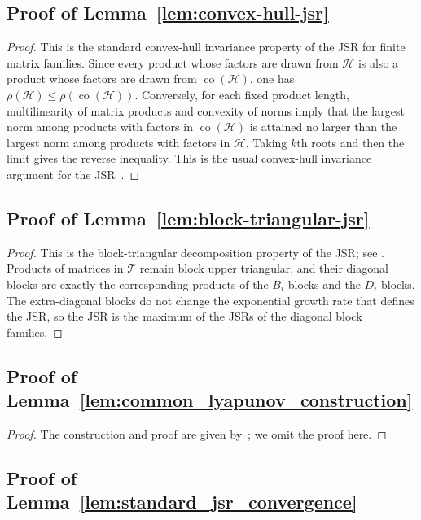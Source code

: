 \documentclass[letterpaper]{article}
\numberwithin{equation}{section}
\newcommand{\co}{\operatorname{co}}
\begin{document}
\subsection{Proof of Lemma~\ref{lem:convex-hull-jsr}}
\label{app:proof-lem-convex-hull-jsr}
\begin{proof}
This is the standard convex-hull invariance property of the JSR for finite matrix
families. Since every product whose factors are drawn from $\mathcal H$ is also a
product whose factors are drawn from $\co(\mathcal H)$, one has
$\rho(\mathcal H)\leq \rho(\co(\mathcal H))$. Conversely, for each fixed product
length, multilinearity of matrix products and convexity of norms imply that the
largest norm among products with factors in $\co(\mathcal H)$ is attained no
larger than the largest norm among products with factors in $\mathcal H$. Taking
$k$th roots and then the limit gives the reverse inequality. This is the usual
convex-hull invariance argument for the JSR~\citep[Chapter~1]{jungers2009joint}.
\end{proof}

\subsection{Proof of Lemma~\ref{lem:block-triangular-jsr}}
\label{app:proof-lem-block-triangular-jsr}

\begin{proof}
This is the block-triangular decomposition property of the JSR; see \citep[Proposition~1.5]{jungers2009joint}. Products of matrices in
$\mathcal T$ remain block upper triangular, and their diagonal blocks are exactly
the corresponding products of the $B_i$ blocks and the $D_i$ blocks. The
extra-diagonal blocks do not change the exponential growth rate that defines the
JSR, so the JSR is the maximum of the JSRs of the diagonal block families.
\end{proof}

\subsection{Proof of Lemma~\ref{lem:common_lyapunov_construction}}
\label{app:proof-lem-common-lyapunov-construction}

\begin{proof}
The construction and proof are given by~\citet{lee2026lyapunovcertified,hushenzhang2010generating}; we
omit the proof here.
\end{proof}

\subsection{Proof of Lemma~\ref{lem:standard_jsr_convergence}}
\label{app:proof-lem-standard-jsr-convergence}
\end{document}
